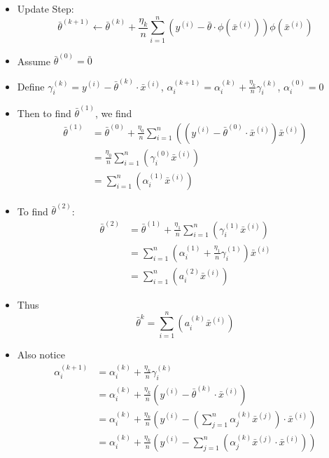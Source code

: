 \documentclass[12pt]{article}
\begin{document}
\begin{itemize}
	\item Update Step:
		\[
			\bar{\theta}^{(k+1)} \gets \bar{\theta}^{(k)} + \frac {\eta_k} {n} \sum_{i=1}^n (y^{(i)} - \bar{\theta} \cdot \phi(\bar{x}^{(i)}))\phi(\bar{x}^{(i)})
		\]
	\item Assume $\bar{\theta}^{(0)} = \bar{0}$
	\item Define $\gamma_i^{(k)} = y^{(i)} - \bar{\theta}^{(k)} \cdot \bar x^{(i)}$, \quad $\alpha_i^{(k+1)} = \alpha_i^{(k)} + \frac{\eta_k}n \gamma_i^{(k)}$, \quad $\alpha_i^{(0)} = 0$
	\item Then to find $\bar{\theta}^{(1)}$, we find
		\[ 
			\begin{aligned}
				\bar{\theta}^{(1)} &= \bar{\theta}^{(0)} + \frac {\eta_0} n \sum_{i=1}^n((y^{(i)} - \bar{\theta}^{(0)} \cdot \bar{x}^{(i)}) \bar{x}^{(i)})\\
													 &= \frac{\eta_0}n \sum_{i = 1}^n (\gamma_i^{(0)} \bar{x}^{(i)})\\
													 &= \sum_{i = 1}^n (\alpha_i^{(1)} \bar{x}^{(i)})
			\end{aligned}
		\]
	\item To find $\bar{\theta}^{(2)}$:
		\[ 
			\begin{aligned}
				\bar{\theta}^{(2)} &= \bar{\theta}^{(1)} + \frac{\eta_1}n \sum_{i=1}^n (\gamma_i^{(1)} \bar{x}^{(i)})\\
													 &= \sum_{i=1}^n (\alpha_i^{(1)} + \frac{\eta_1}n \gamma_i^{(1)}) \bar{x}^{(i)}\\
													 &= \sum_{i=1}^n (a_i^{(2)} \bar{x}^{(i)})
			\end{aligned}
		\]
		\item Thus
			\[ \bar{\theta}^{k} = \sum_{i=1}^n (a_i^{(k)} \bar{x}^{(i)}) \]
		\item Also notice
			\[ 
				\begin{aligned}
					\alpha_i^{(k+1)} &= \alpha_i^{(k)} + \frac{\eta_k}n \gamma_i^{(k)}\\
													 &= \alpha_i^{(k)} + \frac{\eta_k}n (y^{(i)} - \bar{\theta}^{(k)} \cdot \bar{x}^{(i)})\\
													 &= \alpha_i^{(k)} + \frac{\eta_k}n \left( y^{(i)} - \left( \sum_{j=1}^n \alpha_j^{(k)} \bar{x}^{(j)} \right) \cdot \bar{x}^{(i)} \right)\\
													 &= \alpha_i^{(k)} + \frac{\eta_k}n \left( y^{(i)} - \sum_{j=1}^n \left(  \alpha_j^{(k)} \bar{x}^{(j)} \cdot \bar{x}^{(i)} \right) \right)
				\end{aligned}
\]
\end{itemize}
\end{document}

